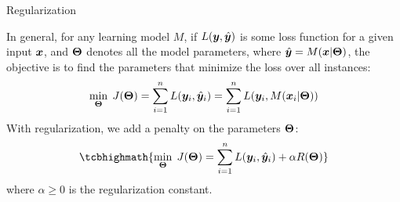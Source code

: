 \begin{frame}{Regularization}
%

\medskip

In general, for any learning model $M$, if $L({\boldsymbol y}, \hat{{\boldsymbol y}})$ is some loss
function for a given input ${\boldsymbol x}$, and ${\bm \Theta}$ denotes all the model
parameters, where $\hat{{\boldsymbol y}} = M({\boldsymbol x} | {\bm \Theta})$,
the objective is to find the parameters that
minimize the loss over all instances:
\begin{align*}
    \min_{{\bm \Theta}} \; J({\bm \Theta}) =  
   \sum_{i=1}^n L({\boldsymbol y}_i, \hat{{\boldsymbol y}}_i) = 
    \sum_{i=1}^n L({\boldsymbol y}_i, M({\boldsymbol x}_i|{\bm \Theta}))
\end{align*}
With regularization, we add a penalty on the parameters ${\bm \Theta}$:
\begin{align*}
    \tcbhighmath{
    \min_{\bTheta} \; J(\bTheta) = 
\sum_{i=1}^n L(\by_i, \hby_i) + \alpha R(\bTheta)}
\end{align*}
where $\alpha \ge 0$ is the regularization constant.
\end{frame}

